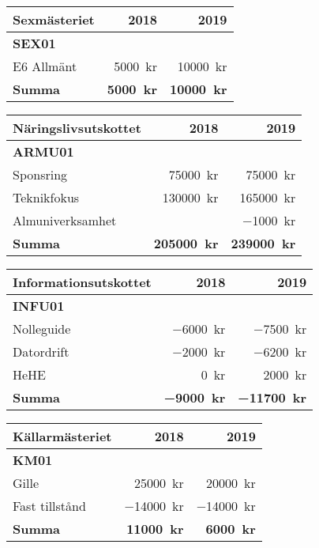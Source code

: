 \documentclass[10pt]{article}
\begin{document}
    \begin{tabularx}{10cm}{X r r}
        \textbf{\large Sexmästeriet} & \textbf{2018} & \textbf{2019} \\
        \hline
        \textbf{SEX01} \\
        E6 Allmänt & \SI{5000}{kr} & \SI{10000}{kr} \\
        \hline
        \textbf{Summa} & \textbf{\SI{5000}{kr}} & \textbf{\SI{10000}{kr}} \\
    \end{tabularx}
    
    \begin{tabularx}{10cm}{X r r}
        \textbf{\large Näringslivsutskottet} & \textbf{2018} & \textbf{2019} \\
        \hline
        \textbf{ARMU01} \\
        Sponsring & \SI{75000}{kr} & \SI{75000}{kr} \\
        Teknikfokus & \SI{130000}{kr} & \SI{165000}{kr} \\
        Almuniverksamhet &  & \SI{-1000}{kr} \\
        \hline
        \textbf{Summa} & \textbf{\SI{205000}{kr}} & \textbf{\SI{239000}{kr}} \\
    \end{tabularx}
    
    \begin{tabularx}{10cm}{X r r}
        \textbf{\large Informationsutskottet} & \textbf{2018} & \textbf{2019} \\
        \hline
        \textbf{INFU01} \\
        Nolleguide & \SI{-6000}{kr} & \SI{-7500}{kr} \\
        Datordrift & \SI{-2000}{kr} & \SI{-6200}{kr} \\
        HeHE & \SI{0}{kr} & \SI{2000}{kr} \\
        \hline
        \textbf{Summa} & \textbf{\SI{-9000}{kr}} & \textbf{\SI{-11700}{kr}} \\
    \end{tabularx}
    
    \begin{tabularx}{10cm}{X r r}
        \textbf{\large Källarmästeriet} & \textbf{2018} & \textbf{2019} \\
        \hline
        \textbf{KM01} \\
        Gille & \SI{25000}{kr} & \SI{20000}{kr} \\
        Fast tillstånd & \SI{-14000}{kr} & \SI{-14000}{kr} \\
        \hline
        \textbf{Summa} & \textbf{\SI{11000}{kr}} & \textbf{\SI{6000}{kr}} \\
    \end{tabularx}
    
\end{document}
